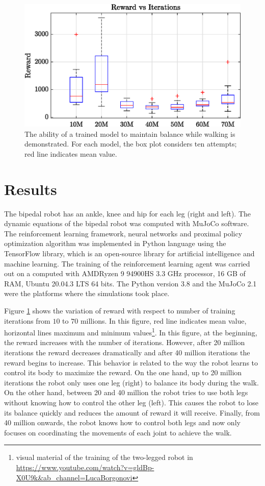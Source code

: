 \begin{figure}
	\centering
	\includegraphics{images/reward_vs_iter.eps}
	\caption{The ability of a trained model to maintain balance while walking is demonstrated. For each model, the box plot considers ten attempts; red line indicates mean value.}
	\label{fig:boxplot}
\end{figure}

\section{Results}
The bipedal robot has an ankle, knee and hip for each leg (right and left). The dynamic equations of the bipedal robot was computed with MuJoCo software. The reinforcement learning framework,  neural networks and proximal policy optimization algorithm was implemented in Python language using the TensorFlow library, which is an open-source library for artificial intelligence and machine learning. The training of the reinforcement learning agent was carried out on a computed with AMD\textregistered Ryzen 9 94900HS 3.3 GHz processor, 16 GB of RAM, Ubuntu 20.04.3 LTS 64 bits. The Python version 3.8 and the MuJoCo 2.1 were the platforms where the simulations took place.

Figure \ref{fig:boxplot} shows the variation of reward with respect to number of training iterations from $10$ to $70$ millions. In this figure, red line indicates mean value, horizontal lines maximum and minimum values\footnote{visual material of the training of the two-legged robot in \url{https://www.youtube.com/watch?v=gldBp-X0U9k&ab_channel=LucaBorgonovi}}. In this figure, at the beginning, the reward increases with the number of iterations. However, after 20 million iterations the reward decreases dramatically and after 40 million iterations the reward begins to increase. This behavior is related to the way the robot learns to control its body to maximize the reward. On the one hand, up to 20 million iterations the robot only uses one leg (right) to balance its body during the walk. On the other hand, between 20 and 40 million the robot tries to use both legs without knowing how to control the other leg (left). This causes the robot to lose its balance quickly and reduces the amount of reward it will receive. Finally, from 40 million onwards, the robot knows how to control both legs and now only focuses on coordinating the movements of each joint to achieve the walk.




